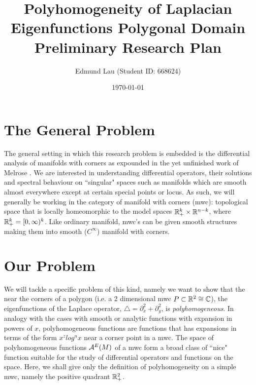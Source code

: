 \documentclass{article}
\title{Polyhomogeneity of Laplacian Eigenfunctions Polygonal Domain \\  Preliminary Research Plan}
\author{Edmund Lau  (Student ID: 668624)}
\date{\today}
\begin{document}
\maketitle



\section{The General Problem}
The general setting in which this research problem is embedded is the differential analysis of manifolds with corners as expounded in the yet unfinished work of Melrose \cite{rbm_daomwc}. We are interested in understanding differential operators, their solutions and spectral behaviour on ``singular" spaces such as manifolds which are smooth almost everywhere except at certain special points or locus. As such, we will generally be working in the category of manifold with corners (mwc): topological space that is locally homeomorphic to the model spaces $\mathbb R_+^{k} \times \mathbb R^{n - k}$, where $\mathbb R_+^k = [0, \infty)^k$. Like ordinary manifold, mwc's can be given smooth structures making them into smooth ($C^\infty$) manifold with corners. 

\section{Our Problem}
We will tackle a specific problem of this kind, namely we want to show that the near the corners of a polygon (i.e. a 2 dimensional mwc $P \subset \mathbb R^2 \cong \mathbb C$), the eigenfunctions of the Laplace operator, $\triangle = \partial_x^2 + \partial_y^2$, is \emph{polyhomogeneous}. In analogy with the cases with smooth or analytic functions with expansion in powers of $x$, polyhomogeneous functions are functions that has expansions in terms of the form $x^z log^nx$  near a corner point in a mwc. The space of polyhomogeneous functions ${\cal A}^E(M)$ of a mwc form a broad class of ``nice" function suitable for the study of differential operators and functions on the space. Here, we shall give only the definition of polyhomogeneity on a simple mwc, namely the positive quadrant $\mathbb R_+^2$. 
\end{document}
